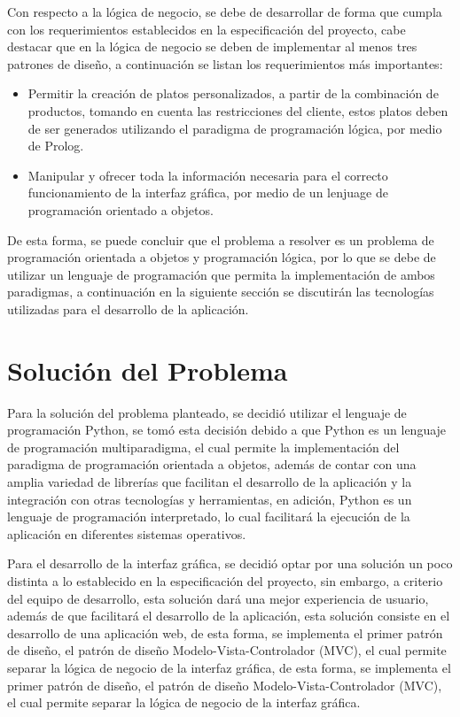 Con respecto a la lógica de negocio, se debe de desarrollar de forma que 
cumpla con los requerimientos establecidos en la especificación del proyecto, 
cabe destacar que en la lógica de negocio se deben de implementar al menos 
tres patrones de diseño, a continuación se listan los requerimientos más 
importantes:

\begin{itemize}
    \item Permitir la creación de platos personalizados, a partir de la 
    combinación de productos, tomando en cuenta las restricciones del cliente, 
    estos platos deben de ser generados utilizando el paradigma de programación
    lógica, por medio de Prolog.
    \item Manipular y ofrecer toda la información necesaria para el correcto 
    funcionamiento de la interfaz gráfica, por medio de un lenjuage de 
    programación orientado a objetos. 
\end{itemize}

De esta forma, se puede concluir que el problema a resolver es un problema 
de programación orientada a objetos y programación lógica, por lo que se 
debe de utilizar un lenguaje de programación que permita la implementación 
de ambos paradigmas, a continuación en la siguiente sección se discutirán 
las tecnologías utilizadas para el desarrollo de la aplicación.

\section{Solución del Problema}

Para la solución del problema planteado, se decidió utilizar el lenguaje de 
programación Python, se tomó esta decisión debido a que Python es un
lenguaje de programación multiparadigma, el cual permite la implementación 
del paradigma de programación orientada a objetos, además de contar 
con una amplia variedad de librerías que facilitan el desarrollo de
la aplicación y la integración con otras tecnologías y herramientas, 
en adición, Python es un lenguaje de programación interpretado, lo cual 
facilitará la ejecución de la aplicación en diferentes sistemas operativos.

Para el desarrollo de la interfaz gráfica, se decidió optar por una 
solución un poco distinta a lo establecido en la especificación del 
proyecto, sin embargo, a criterio del equipo de desarrollo, esta solución 
dará una mejor experiencia de usuario, además de que facilitará el 
desarrollo de la aplicación, esta solución consiste en el desarrollo de 
una aplicación web, de esta forma, se implementa el primer patrón de diseño, 
el patrón de diseño Modelo-Vista-Controlador (MVC), el cual permite separar 
la lógica de negocio de la interfaz gráfica, de esta forma, se implementa 
el primer patrón de diseño, el patrón de diseño Modelo-Vista-Controlador 
(MVC), el cual permite separar la lógica de negocio de la interfaz gráfica.

